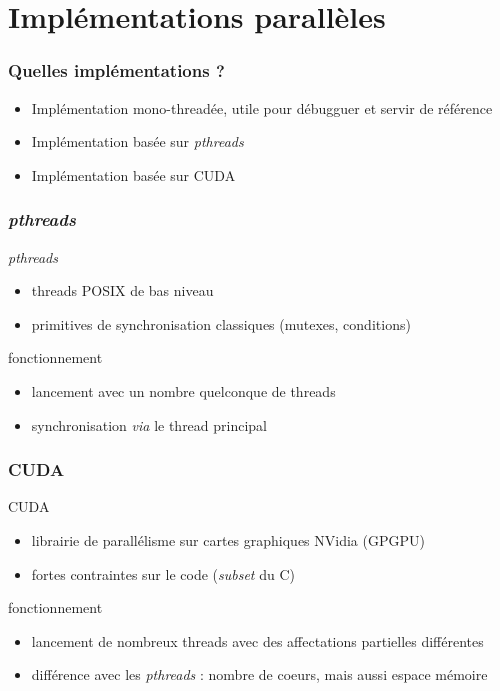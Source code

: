 \documentclass{beamer}
\newcommand{\cuda}{\textsc{CUDA}}
\begin{document}

\section{Implémentations parallèles}
\begin{frame}
\frametitle{Quelles implémentations ?}

\begin{itemize}
    \item Implémentation mono-threadée, utile pour débugguer et servir de référence
    \pause
    \item Implémentation basée sur \emph{pthreads}
    \pause
    \item Implémentation basée sur \cuda
\end{itemize}
\end{frame}

\begin{frame}
\frametitle{\emph{pthreads}}

\begin{block}{\emph{pthreads}}
\begin{itemize}
    \item threads \textsc{POSIX} de bas niveau
    \item primitives de synchronisation classiques (mutexes, conditions)
\end{itemize}
\end{block}
\pause

\begin{block}{fonctionnement}
\begin{itemize}
    \item lancement avec un nombre quelconque de threads
    \item synchronisation \emph{via} le thread principal
\end{itemize}
\end{block}
\end{frame}



\begin{frame}
\frametitle{\cuda}

\begin{block}{\cuda}
\begin{itemize}
    \item librairie de parallélisme sur cartes graphiques NVidia (GPGPU)
    \item fortes contraintes sur le code (\emph{subset} du C)
\end{itemize}
\end{block}
\pause
\begin{block}{fonctionnement}
\begin{itemize}
    \item lancement de nombreux threads avec des affectations partielles différentes
    \item différence avec les \emph{pthreads} : nombre de coeurs, mais aussi espace mémoire
\end{itemize}
\end{block}
\end{frame}
\end{document}
